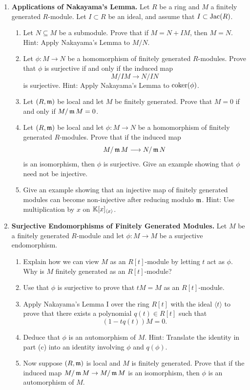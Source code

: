 \documentclass[Notebook.tex]{subfiles}
\begin{document}
\begin{enumerate}[leftmargin=*, resume=problems]
\item \textbf{Applications of Nakayama's Lemma.} Let $R$ be a ring and $M$ a finitely generated $R$-module. Let $I \subset R$ be an ideal, and assume that $I \subset \text{Jac}(R)$. 
\begin{enumerate}
    \item Let $N\subseteq M$ be a submodule. Prove that if $M=N+IM$, then $M=N$. Hint: Apply Nakayama's Lemma to $M/N$.
    \item Let $\phi:M\to N$ be a homomorphism of finitely generated $R$-modules. Prove that $\phi$ is surjective if and only if the induced map
    \[
    M/IM\longrightarrow N/IN
    \]
    is surjective. Hint: Apply Nakayama's Lemma to $\operatorname{coker}(\phi)$.
     \item Let $(R,\operatorname{\mathfrak{m}})$ be local and let $M$ be finitely generated. Prove that $M=0$ if and only if $M/\operatorname{\mathfrak{m}} M=0$.
    \item Let $(R,\operatorname{\mathfrak{m}})$ be local and let $\phi:M\to N$ be a homomorphism of finitely generated $R$-modules. Prove that if the induced map
    \[
    M/\operatorname{\mathfrak{m}} M\longrightarrow N/\operatorname{\mathfrak{m}} N
    \]
    is an isomorphism, then $\phi$ is surjective. Give an example showing that $\phi$ need not be injective.
        \item Give an example showing that an injective map of finitely generated modules can become non-injective after reducing modulo $\operatorname{\mathfrak{m}}$. Hint: Use multiplication by $x$ on $\mathbb K[x]_{\langle x\rangle}$.
\end{enumerate}


\item \textbf{Surjective Endomorphisms of Finitely Generated Modules.} Let $M$ be a finitely generated $R$-module and let $\phi:M\to M$ be a surjective endomorphism.
\begin{enumerate}
    \item Explain how we can view $M$ as an $R[t]$-module by letting $t$ act as $\phi$. Why is $M$ finitely generated as an $R[t]$-module?
    \item Use that $\phi$ is surjective to prove that $tM=M$ as an $R[t]$-module.
    \item Apply Nakayama's Lemma I over the ring $R[t]$ with the ideal $\langle t\rangle$ to prove that there exists a polynomial $q(t)\in R[t]$ such that
    \[
    (1-tq(t))M=0.
    \]
    \item Deduce that $\phi$ is an automorphism of $M$. Hint: Translate the identity in part (c) into an identity involving $\phi$ and $q(\phi)$.
    \item Now suppose $(R,\operatorname{\mathfrak{m}})$ is local and $M$ is finitely generated. Prove that if the induced map $M/\operatorname{\mathfrak{m}} M\to M/\operatorname{\mathfrak{m}} M$ is an isomorphism, then $\phi$ is an automorphism of $M$.
\end{enumerate}


\end{enumerate}
\end{document}
